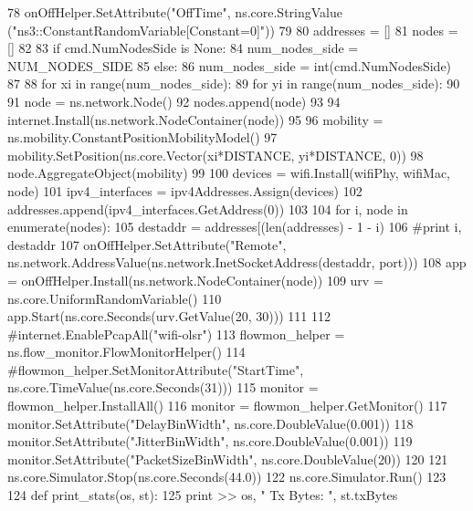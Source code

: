 \begin{DoxyCode}
78     onOffHelper.SetAttribute(\textcolor{stringliteral}{"OffTime"}, ns.core.StringValue (\textcolor{stringliteral}{"ns3::ConstantRandomVariable[Constant=0]"}))
79 
80     addresses = []
81     nodes = []
82 
83     \textcolor{keywordflow}{if} cmd.NumNodesSide \textcolor{keywordflow}{is} \textcolor{keywordtype}{None}:
84         num\_nodes\_side = NUM\_NODES\_SIDE
85     \textcolor{keywordflow}{else}:
86         num\_nodes\_side = int(cmd.NumNodesSide)
87 
88     \textcolor{keywordflow}{for} xi \textcolor{keywordflow}{in} range(num\_nodes\_side):
89         \textcolor{keywordflow}{for} yi \textcolor{keywordflow}{in} range(num\_nodes\_side):
90 
91             node = ns.network.Node()
92             nodes.append(node)
93 
94             internet.Install(ns.network.NodeContainer(node))
95 
96             mobility = ns.mobility.ConstantPositionMobilityModel()
97             mobility.SetPosition(ns.core.Vector(xi*DISTANCE, yi*DISTANCE, 0))
98             node.AggregateObject(mobility)
99             
100             devices = wifi.Install(wifiPhy, wifiMac, node)
101             ipv4\_interfaces = ipv4Addresses.Assign(devices)
102             addresses.append(ipv4\_interfaces.GetAddress(0))
103 
104     \textcolor{keywordflow}{for} i, node \textcolor{keywordflow}{in} enumerate(nodes):
105         destaddr = addresses[(len(addresses) - 1 - i) %
106         \textcolor{comment}{#print i, destaddr}
107         onOffHelper.SetAttribute(\textcolor{stringliteral}{"Remote"}, ns.network.AddressValue(ns.network.InetSocketAddress(destaddr, 
      port)))
108         app = onOffHelper.Install(ns.network.NodeContainer(node))
109         urv = ns.core.UniformRandomVariable()
110         app.Start(ns.core.Seconds(urv.GetValue(20, 30)))
111 
112     \textcolor{comment}{#internet.EnablePcapAll("wifi-olsr")}
113     flowmon\_helper = ns.flow\_monitor.FlowMonitorHelper()
114     \textcolor{comment}{#flowmon\_helper.SetMonitorAttribute("StartTime", ns.core.TimeValue(ns.core.Seconds(31)))}
115     monitor = flowmon\_helper.InstallAll()
116     monitor = flowmon\_helper.GetMonitor()
117     monitor.SetAttribute(\textcolor{stringliteral}{"DelayBinWidth"}, ns.core.DoubleValue(0.001))
118     monitor.SetAttribute(\textcolor{stringliteral}{"JitterBinWidth"}, ns.core.DoubleValue(0.001))
119     monitor.SetAttribute(\textcolor{stringliteral}{"PacketSizeBinWidth"}, ns.core.DoubleValue(20))
120 
121     ns.core.Simulator.Stop(ns.core.Seconds(44.0))
122     ns.core.Simulator.Run()
123 
124     \textcolor{keyword}{def }print\_stats(os, st):
125         \textcolor{keywordflow}{print} >> os, \textcolor{stringliteral}{"  Tx Bytes: "}, st.txBytes

\end{DoxyCode}
